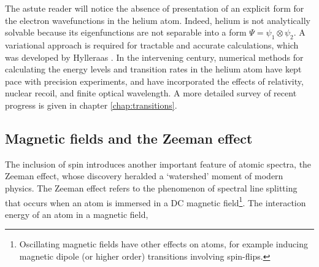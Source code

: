 	The astute reader will notice the absence of presentation of an explicit form for the electron wavefunctions in the helium atom.
	Indeed,	helium is not analytically solvable because its eigenfunctions are not separable into a form $\Psi = \psi_1\otimes\psi_2$.
	A variational approach is required for tractable and accurate calculations, which was developed by Hylleraas \cite{Hylleraas1920,Hylleraas1929,Hylleraas1930}.
	In the intervening century, numerical methods for calculating the energy levels and transition rates in the helium atom have kept pace with precision experiments, and have incorporated the effects of relativity, nuclear recoil, and finite optical wavelength. A more detailed survey of recent progress is given in chapter \ref{chap:transitions}.

	

	

	\subsection*{Magnetic fields and the Zeeman effect}

	The inclusion of spin introduces another important feature of atomic spectra, the Zeeman effect, whose discovery heralded a `watershed' moment of modern physics.
	The Zeeman effect refers to the phenomenon of spectral line splitting that occurs when an atom is immersed in a DC magnetic field\footnote{Oscillating magnetic fields have other effects on atoms, for example inducing magnetic dipole (or higher order) transitions involving spin-flips.}.
	The interaction energy of an atom in a magnetic field, 
	
